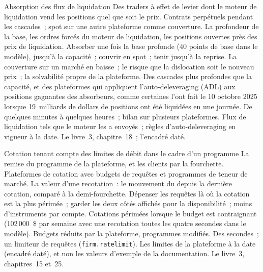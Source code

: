 \begin{strategyfile}{Absorption des flux de liquidation}\label{strat:hf:crypto-high-frequency-trading-on-centralised-venues:liquidation}
 Des traders à effet de levier dont le moteur de liquidation vend les positions quel que soit le prix.
 Contrats perpétuels pendant les cascades~; spot sur une autre plateforme comme couverture.
 La profondeur de la base, les ordres forcés du moteur de liquidation, les positions ouvertes près des prix de liquidation.
 Absorber une fois la base profonde (40 points de base dans le modèle), jusqu'à la capacité~; couvrir en spot~; tenir jusqu'à la reprise.
 La couverture sur un marché en baisse~; le risque que la dislocation soit le nouveau prix~; la solvabilité propre de la plateforme.
 Des cascades plus profondes que la capacité, et des plateformes qui appliquent l'auto-deleveraging (ADL) aux positions gagnantes des absorbeurs, comme certaines l'ont fait le 10 octobre 2025
lorsque 19~milliards de dollars de positions ont été liquidées en une journée.
 De quelques minutes à quelques heures~; bilan sur plusieurs plateformes.
 Flux de liquidation tels que le moteur les a envoyés~; règles d'auto-deleveraging en vigueur à la date.
 Le livre~3, chapitre~18~; l'encadré daté.
\end{strategyfile}

\begin{strategyfile}{Cotation tenant compte des limites de débit dans le cadre d'un programme}\label{strat:hf:crypto-high-frequency-trading-on-centralised-venues:ratelimit}
 La remise du programme de la plateforme, et les clients par la fourchette.
 Plateformes de cotation avec budgets de requêtes et programmes de teneur de marché.
 La valeur d'une recotation~: le mouvement du  depuis la dernière cotation, comparé à la demi-fourchette.
 Dépenser les requêtes là où la cotation est la plus périmée~; garder les deux côtés affichés pour la disponibilité~; moins d'instruments par compte.
 Cotations périmées lorsque le budget est contraignant (102\,000~\$ par semaine avec une recotation toutes les quatre secondes dans le modèle).
 Budgets réduits par la plateforme, programmes modifiés.
 Des secondes~; un limiteur de requêtes (\texttt{firm.ratelimit}).
 Les limites de la plateforme à la date (encadré daté), et non les valeurs d'exemple de la documentation.
 Le livre~3, chapitres~15 et~25.
\end{strategyfile}


